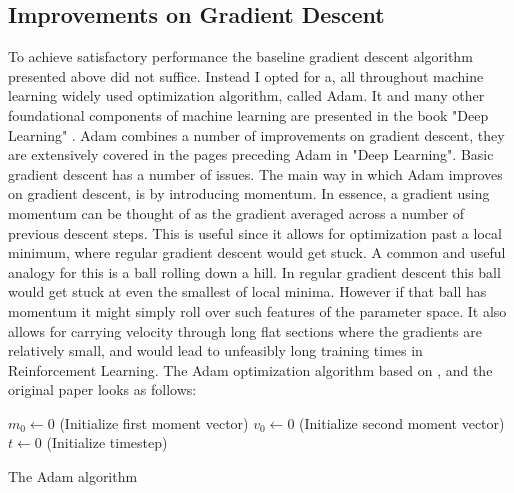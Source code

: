 \subsection{Improvements on Gradient Descent}\label{subsec:gd:adam}
To achieve satisfactory performance the baseline gradient descent algorithm presented above did not suffice. Instead I opted for a, all throughout machine learning widely used optimization algorithm, called Adam. It and many other foundational components of machine learning are presented in the book "Deep Learning" \cite[pg 305]{Goodfellow-et-al-2016}. Adam combines a number of improvements on gradient descent, they are extensively covered in the pages preceding Adam in "Deep Learning". Basic gradient descent has a number of issues. The main way in which Adam improves on gradient descent, is by introducing momentum. In essence, a gradient using momentum can be thought of as the gradient averaged across a number of previous descent steps. This is useful since it allows for optimization past a local minimum, where regular gradient descent would get stuck. A common and useful analogy for this is a ball rolling down a hill. In regular gradient descent this ball would get stuck at even the smallest of local minima. However if that ball has momentum it might simply roll over such features of the parameter space. It also allows for carrying velocity through long flat sections where the gradients are relatively small, and would lead to unfeasibly long training times in Reinforcement Learning. The Adam optimization algorithm based on \cite[p. 306]{Goodfellow-et-al-2016}, and the original paper \cite{kingma2017adam} looks as follows:

\begin{algorithm}[H]
\DontPrintSemicolon
\SetAlgoLined
 \KwRequire{$\rho_1, \rho_2 \in \left[0, 1\right)$ Exponential decay rates for momentum estimates}
 $m_0 \leftarrow 0$ (Initialize first moment vector)\;
 $v_0 \leftarrow 0$ (Initialize second moment vector)\;
 $t \leftarrow 0$ (Initialize timestep)\;
 \caption{The Adam algorithm}
\end{algorithm}

